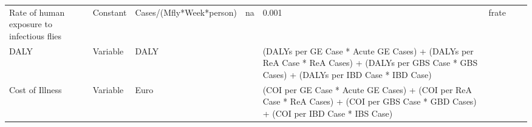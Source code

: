 \begin{landscape}
\begin{longtable}[c]{m{10em}lllm{15em}lll}
Rate of human exposure to infectious flies    & Constant & Cases/(Mfly*Week*person) & na                        & 0.001                                                                                                                                                                                                                                                                                    & frate                                                                                                                                                                                        &                                                                                                                                                                                                                                       \\
DALY                                          & Variable & DALY                     &                           & (DALYs per GE Case * Acute GE Cases) + (DALYs per ReA Case * ReA Cases) + (DALYs per GBS Case * GBS Cases) + (DALYs per IBD Case * IBD Case)                                                                                                                                             &                                                                                                                                                                                              &                                                                                                                                                                                                                                       \\
Cost of Illness                               & Variable & Euro                     &                           & (COI per GE Case * Acute GE Cases) + (COI per ReA Case * ReA Cases) + (COI per GBS Case * GBD Cases) + (COI per IBD Case * IBS Case)                                                                                                                                                     &                                                                                                                                                                                              &                                                                                                                                                                                                                                       \\

\end{longtable}
\end{landscape}
